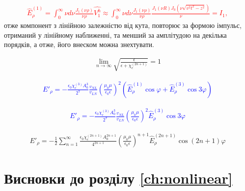 \textcolor{red} { \begin{equation} \begin{aligned} \label{eq:erho_norm}
\hat{E}_\rho^{(1)} = \int_0^\infty \nu d \nu 
\frac{J_1(\nu \rho)}{\nu \rho} \hat{V_1^h} \approx
\int_0^\infty \nu d \nu \frac{J_1(\nu \rho)}{\nu \rho} 
\frac{J_1(\nu R) J_0(\nu \sqrt{v^2t^2-z^2})}{\nu} = I_1,
\end{aligned} \end{equation} }
%
отже компонент з лінійною залежністю від кута, повторює за формою 
імпульс, отриманий у лінійному наближенні, та менший за амплітудою на 
декілька порядків, а отже, його внеском можна знехтувати.

\begin{equation*} \begin{aligned}
\lim_{n \to \infty} 
\sqrt{ \frac{\epsilon}{ \epsilon + \chi_e^{(2n+1)}} } = 1
\end{aligned} \end{equation*}

\textcolor{blue} { \begin{equation*} \begin{aligned}
E'_\rho = - \frac{\epsilon_0 \chi_e^{(3)} A_0^3}{2^7}
\frac{v_{NL}}{v_{LN}}
\left( \frac{\mu_0 \mu}{\epsilon_0 \epsilon} \right)^2
\left(\hat{E}_\rho^{(1)} \cos \varphi +
\hat{E}_\rho^{(3)} \cos 3 \varphi \right)
\end{aligned} \end{equation*} }

\textcolor{blue} { \begin{equation*} \begin{aligned}
E'_\rho = - \frac{\epsilon_0 \chi_e^{(3)} A_0^3}{2^7}
\frac{v_{NL}}{v_{LN}}
\left( \frac{\mu_0 \mu}{\epsilon_0 \epsilon} \right)^2 
\hat{E}_\rho^{(3)} \cos 3 \varphi
\end{aligned} \end{equation*} }

\begin{equation*} \begin{aligned}
E'_\rho = - \frac{1}{2} \sum_{n=1}^{\infty} 
\frac{\epsilon_0 \chi_e^{(2n+1)} A_0^{2n+1} }{ 4^{2n+1} }
\left( \frac{\mu_0 \mu}{\epsilon_0 \epsilon} \right)^{n+1}
\hat{E}_\rho^{(2n+1)} \cos (2n + 1) \varphi
\end{aligned} \end{equation*}

\section*{Висновки до розділу \ref{ch:nonlinear}}

